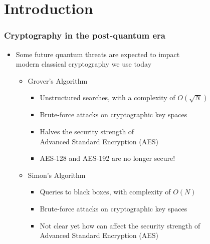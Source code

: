 \documentclass{beamer}
\begin{document}
	\section{Introduction}
		\begin{frame}
			\frametitle{\LARGE Cryptography in the post-quantum era}
			\begin{itemize}
                \item Some future quantum threats are expected to impact\\ modern classical cryptography we use today
                \begin{itemize}
                    \item Grover's Algorithm
                    \begin{itemize}
                        \item Unstructured searches, with a complexity of $O(\sqrt{N})$
                        \item Brute-force attacks on cryptographic key spaces
                        \item Halves the security strength of\\ Advanced Standard Encryption (AES)
                        \item AES-128 and AES-192 are no longer secure!
                    \end{itemize}
                    \item Simon's Algorithm
                    \begin{itemize}
                        \item Queries to black boxes, with complexity of $O(N)$
                        \item Brute-force attacks on cryptographic key spaces
                        \item Not clear yet how can affect the security strength of\\ Advanced Standard Encryption (AES)
                    \end{itemize}
                \end{itemize}
            \end{itemize}
		\end{frame}
\end{document}
